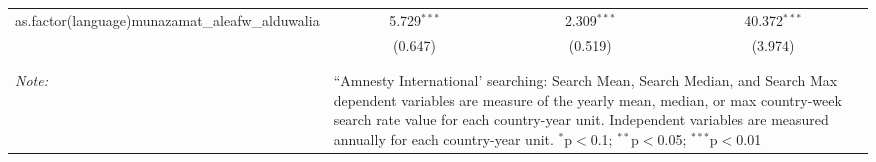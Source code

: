 \begin{table}[!htbp]
\begin{tabular}{@{\extracolsep{5pt}}lccc}
  as.factor(language)munazamat\_aleafw\_alduwalia & 5.729$^{***}$ & 2.309$^{***}$ & 40.372$^{***}$ \\ 
  & (0.647) & (0.519) & (3.974) \\ 
 \hline \\[-1.8ex] 
\hline 
\hline \\[-1.8ex] 
\textit{Note:}  & \multicolumn{3}{l}{\parbox[t]{8cm}{``Amnesty International' searching: Search Mean, Search Median, and Search Max dependent variables are measure of the yearly mean, median, or max country-week search rate value for each country-year unit. Independent variables are measured annually for each country-year unit. $^{*}$p$<$0.1; $^{**}$p$<$0.05; $^{***}$p$<$0.01}} \\ 
\end{tabular} 
\end{table} 
